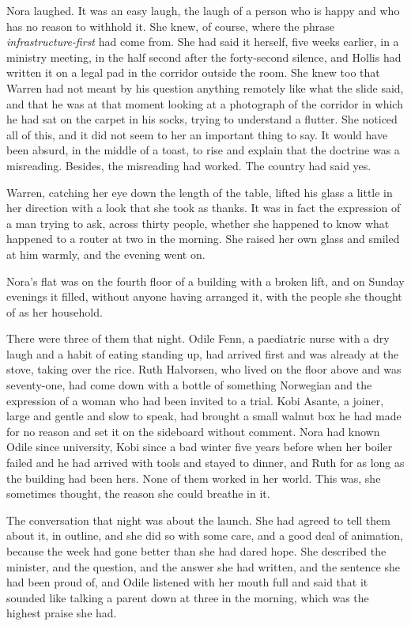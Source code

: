 Nora laughed. It was an easy laugh, the laugh of a person who is happy and who has no reason to withhold it. She knew, of course, where the phrase \emph{infrastructure-first} had come from. She had said it herself, five weeks earlier, in a ministry meeting, in the half second after the forty-second silence, and Hollis had written it on a legal pad in the corridor outside the room. She knew too that Warren had not meant by his question anything remotely like what the slide said, and that he was at that moment looking at a photograph of the corridor in which he had sat on the carpet in his socks, trying to understand a flutter. She noticed all of this, and it did not seem to her an important thing to say. It would have been absurd, in the middle of a toast, to rise and explain that the doctrine was a misreading. Besides, the misreading had worked. The country had said yes.

Warren, catching her eye down the length of the table, lifted his glass a little in her direction with a look that she took as thanks. It was in fact the expression of a man trying to ask, across thirty people, whether she happened to know what happened to a router at two in the morning. She raised her own glass and smiled at him warmly, and the evening went on.

\scenebreak
\noindent Nora's flat was on the fourth floor of a building with a broken lift, and on Sunday evenings it filled, without anyone having arranged it, with the people she thought of as her household.

There were three of them that night. Odile Fenn, a paediatric nurse with a dry laugh and a habit of eating standing up, had arrived first and was already at the stove, taking over the rice. Ruth Halvorsen, who lived on the floor above and was seventy-one, had come down with a bottle of something Norwegian and the expression of a woman who had been invited to a trial. Kobi Asante, a joiner, large and gentle and slow to speak, had brought a small walnut box he had made for no reason and set it on the sideboard without comment. Nora had known Odile since university, Kobi since a bad winter five years before when her boiler failed and he had arrived with tools and stayed to dinner, and Ruth for as long as the building had been hers. None of them worked in her world. This was, she sometimes thought, the reason she could breathe in it.

The conversation that night was about the launch. She had agreed to tell them about it, in outline, and she did so with some care, and a good deal of animation, because the week had gone better than she had dared hope. She described the minister, and the question, and the answer she had written, and the sentence she had been proud of, and Odile listened with her mouth full and said that it sounded like talking a parent down at three in the morning, which was the highest praise she had.


